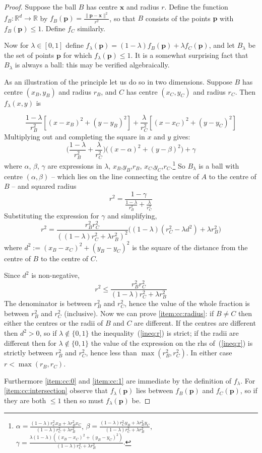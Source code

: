 \documentclass[a4paper]{article}
\newcommand\R{\mathbb{R}}
\begin{document}
\begin{proof}\citep{Welzl}
  \newcommand\x{\mathbf{x}}\newcommand\p{\mathbf{p}}
  Suppose the ball $B$ has centre $\x$ and radius $r$. Define the function $f_B: \R^d\to\R$ by $f_B(\p) = \frac{\|\p-\x\|^2}{r^2}$, so that $B$ consists of the points $\p$ with $f_B(\p)\leq1$. Define $f_C$ similarly.

  Now for $\lambda\in[0,1]$ define $f_\lambda(\p) = (1-\lambda)f_B(\p) + \lambda f_C(\p)$, and let $B_\lambda$ be the set of points $\p$ for which $f_\lambda(\p)\leq1$. It is a somewhat surprising fact that $B_\lambda$ is always a ball: this may be verified algebraically.

  As an illustration of the principle let us do so in two dimensions. Suppose $B$ has centre $(x_B,y_B)$ and radius $r_B$, and $C$ has centre $(x_C,y_C)$ and radius $r_C$. Then $f_\lambda(x,y)$ is

  \[ \frac{1-\lambda}{r_B^2}[(x-x_B)^2 + (y-y_B)^2] + \frac{\lambda}{r_C^2}[(x-x_C)^2 + (y-y_C)^2] \]
  Multiplying out and completing the square in $x$ and $y$ gives:
  \[ \bigl(\frac{1-\lambda}{r_B^2} + \frac{\lambda}{r_C^2}\bigr)\bigl((x-\alpha)^2 + (y-\beta)^2\bigr) + \gamma \]
  where $\alpha$, $\beta$, $\gamma$ are expressions in $\lambda$, $x_B$,$y_B$,$r_B$, $x_C$,$y_C$,$r_C$.\footnote{
    $\alpha = \frac{(1-\lambda) r_C^2 x_B + \lambda r_B^2 x_C}{(1-\lambda) r_C^2 + \lambda r_B^2}$,
    $\beta = \frac{(1-\lambda) r_C^2 y_B + \lambda r_B^2 y_C}{(1-\lambda) r_C^2 + \lambda r_B^2}$,
    $\gamma = \frac{\lambda(1-\lambda)((x_B-x_C)^2+(y_B-y_C)^2)}{(1-\lambda) r_C^2 + \lambda r_B^2}$.
  }
  So $B_\lambda$ is a ball with centre $(\alpha,\beta)$ -- which lies on the line connecting the centre of $A$ to the centre of $B$ -- and squared radius \[ r^2=\frac{1-\gamma}{\frac{1-\lambda}{r_B^2} + \frac{\lambda}{r_C^2}} \]
  Substituting the expression for $\gamma$ and simplifying,
  \[
    r^2 = \frac{r_B^2r_C^2}{((1-\lambda) r_C^2 + \lambda r_B^2)^2}\bigl( (1-\lambda)(r_C^2-\lambda d^2) + \lambda r_B^2 \bigr)
  \]
  where $d^2:=(x_B-x_C)^2+(y_B-y_C)^2$ is the square of the distance from the centre of $B$ to the centre of $C$.

  Since $d^2$ is non-negative,
  \begin{equation}\label{ineq:r}
    r^2 \leq \frac{r_B^2r_C^2}{(1-\lambda) r_C^2 + \lambda r_B^2}
  \end{equation}
  The denominator is between $r_B^2$ and $r_C^2$, hence the value of the whole fraction is between $r_B^2$ and $r_C^2$ (inclusive). Now we can prove \ref{item:cc:radius}: if $B\neq C$ then either the centres or the radii of $B$ and $C$ are different. If the centres are different then $d^2>0$, so if $\lambda\notin\{0,1\}$ the inequality~(\ref{ineq:r}) is strict; if the radii are different then for $\lambda\notin\{0,1\}$ the value of the expression on the rhs of~(\ref{ineq:r}) is strictly between $r_B^2$ and $r_C^2$, hence less than $\max(r_B^2,r_C^2)$. In either case $r<\max(r_B,r_C)$.

  Furthermore \ref{item:cc:0} and \ref{item:cc:1} are immediate by the definition of $f_\lambda$. For \ref{item:cc:intersection} observe that $f_\lambda(\p)$ lies between $f_B(\p)$ and $f_C(\p)$, so if they are both $\leq1$ then so must $f_\lambda(\p)$ be.
\end{proof}
\end{document}
